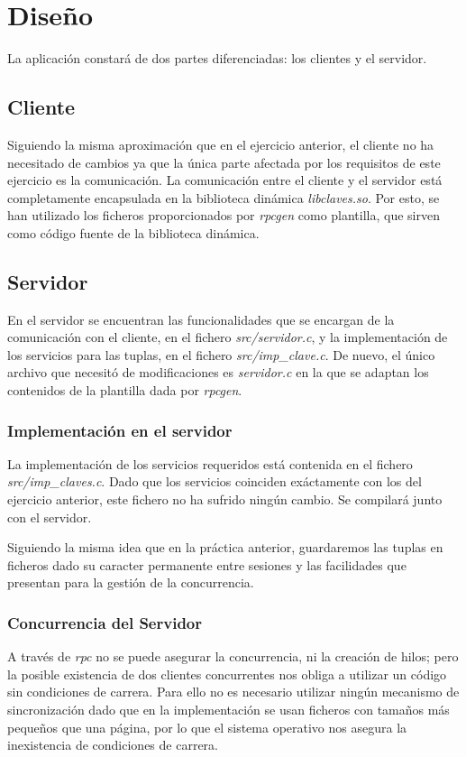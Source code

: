 \documentclass[]{article}
\begin{document}
\section{Diseño}
\label{sec:disenno}
La aplicación constará de dos partes diferenciadas: los clientes y el servidor.

\subsection{Cliente}
\label{subsec:cliente}
Siguiendo la misma aproximación que en el ejercicio anterior, el cliente no ha necesitado de cambios ya que la única parte afectada por los requisitos de este ejercicio es la comunicación. La comunicación entre el cliente y el servidor está completamente encapsulada en la biblioteca dinámica \textit{libclaves.so}. Por esto, se han utilizado los ficheros proporcionados por \textit{rpcgen} como plantilla, que sirven como código fuente de la biblioteca dinámica.

\subsection{Servidor}
\label{subsec:servidor}
En el servidor se encuentran las funcionalidades que se encargan de la comunicación con el cliente, en el fichero \textit{src/servidor.c}, y la implementación de los servicios para las tuplas, en el fichero \textit{src/imp\_clave.c}. De nuevo, el único archivo que necesitó de modificaciones es \textit{servidor.c} en la que se adaptan los contenidos de la plantilla dada por \textit{rpcgen}. 

\subsubsection{Implementación en el servidor}
\label{subsec:implementacion_servidor}

La implementación de los servicios requeridos está contenida en el fichero \textit{src/imp\_claves.c}. Dado que los servicios coinciden exáctamente con los del ejercicio anterior, este fichero no ha sufrido ningún cambio. Se compilará junto con el servidor. 

Siguiendo la misma idea que en la práctica anterior, guardaremos las tuplas en ficheros dado su caracter permanente entre sesiones y las facilidades que presentan para la gestión de la concurrencia.

\subsubsection{Concurrencia del Servidor}
\label{subsec::concurrencia_servidor}
A través de \textit{rpc} no se puede asegurar la concurrencia, ni la creación de hilos; pero la posible existencia de dos clientes concurrentes nos obliga a utilizar un código sin condiciones de carrera. Para ello no es necesario utilizar ningún mecanismo de sincronización dado que en la implementación se usan ficheros con tamaños más pequeños que una página, por lo que el sistema operativo nos asegura la inexistencia de condiciones de carrera.
\end{document}
